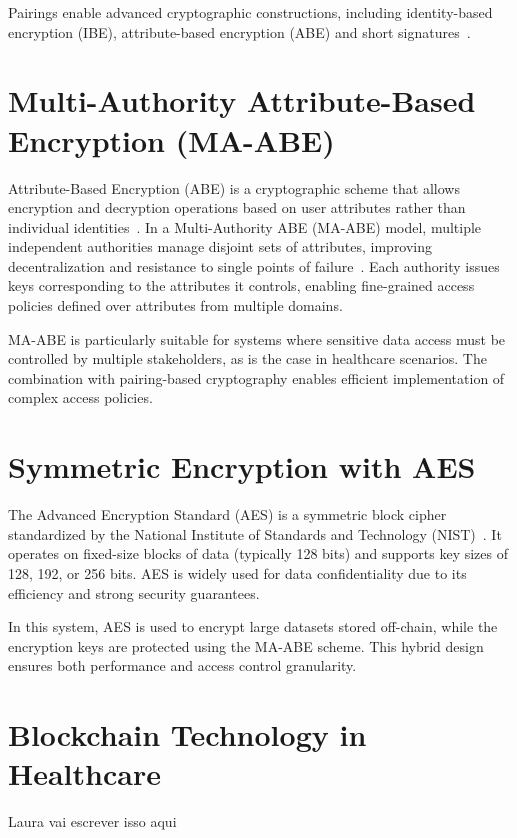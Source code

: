 \documentclass[cic,tc,english]{iiufrgs}
\begin{document}
        Pairings enable advanced cryptographic constructions, including identity-based encryption (IBE), attribute-based encryption (ABE) and short signatures~\citep{boneh2001identity}.

    \section{Multi-Authority Attribute-Based Encryption (MA-ABE)}
        \label{sec:maabe}
        Attribute-Based Encryption (ABE) is a cryptographic scheme that allows encryption and decryption operations based on user attributes rather than individual identities~\citep{goyal2006attribute}. In a Multi-Authority ABE (MA-ABE) model, multiple independent authorities manage disjoint sets of attributes, improving decentralization and resistance to single points of failure~\citep{chase2007multi}. Each authority issues keys corresponding to the attributes it controls, enabling fine-grained access policies defined over attributes from multiple domains.
        
        MA-ABE is particularly suitable for systems where sensitive data access must be controlled by multiple stakeholders, as is the case in healthcare scenarios. The combination with pairing-based cryptography enables efficient implementation of complex access policies.

        
    \section{Symmetric Encryption with AES}
        \label{sec:symmetric}
        The Advanced Encryption Standard (AES) is a symmetric block cipher standardized by the National Institute of Standards and Technology (NIST)~\citep{daemen1999aes}. It operates on fixed-size blocks of data (typically 128 bits) and supports key sizes of 128, 192, or 256 bits. AES is widely used for data confidentiality due to its efficiency and strong security guarantees.
        
        In this system, AES is used to encrypt large datasets stored off-chain, while the encryption keys are protected using the MA-ABE scheme. This hybrid design ensures both performance and access control granularity.
        
    \section{Blockchain Technology in Healthcare}
        \label{sec:blockchain}
        \begin{draft}{Laura vai escrever isso aqui}
        \end{draft}
\end{document}
